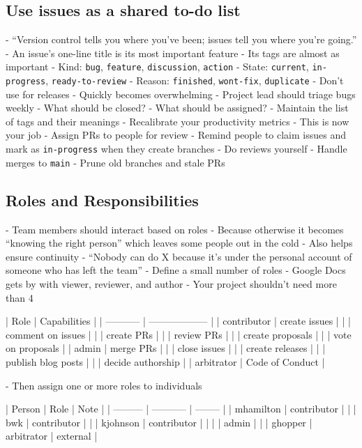 \documentclass[10pt,letterpaper]{article}
\begin{document}
\subsection*{Use issues as a shared to-do list}

- ``Version control tells you where you've been; issues tell you where you're going.''
- An issue's one-line title is its most important feature
- Its tags are almost as important
  - Kind: \texttt{bug}, \texttt{feature}, \texttt{discussion}, \texttt{action}
  - State: \texttt{current}, \texttt{in-progress}, \texttt{ready-to-review}
  - Reason: \texttt{finished}, \texttt{wont-fix}, \texttt{duplicate}
- Don't use for releases
  - Quickly becomes overwhelming
- Project lead should triage bugs weekly
  - What should be closed?
  - What should be assigned?
- Maintain the list of tags and their meanings
- Recalibrate your productivity metrics
  - This is now your job
- Assign PRs to people for review
  - Remind people to claim issues and mark as \texttt{in-progress} when they create branches
- Do reviews yourself
- Handle merges to \texttt{main}
- Prune old branches and stale PRs

\subsection*{Roles and Responsibilities}

- Team members should interact based on roles
  - Because otherwise it becomes ``knowing the right person'' which leaves some people out in the cold
  - Also helps ensure continuity
    - ``Nobody can do X because it's under the personal account of someone who has left the team''
- Define a small number of roles
  - Google Docs gets by with viewer, reviewer, and author
  - Your project shouldn't need more than 4

| Role        | Capabilities       |
| ----------- | ------------------ |
| contributor | create issues      |
|             | comment on issues  |
|             | create PRs         |
|             | review PRs         |
|             | create proposals   |
|             | vote on proposals  |
| admin       | merge PRs          |
|             | close issues       |
|             | create releases    |
|             | publish blog posts |
|             | decide authorship  |
| arbitrator  | Code of Conduct    |

- Then assign one or more roles to individuals

| Person    | Role        | Note     |
| --------- | ----------- | -------- |
| mhamilton | contributor |          |
| bwk       | contributor |          |
| kjohnson  | contributor |          |
|           | admin       |          |
| ghopper   | arbitrator  | external |
\end{document}
